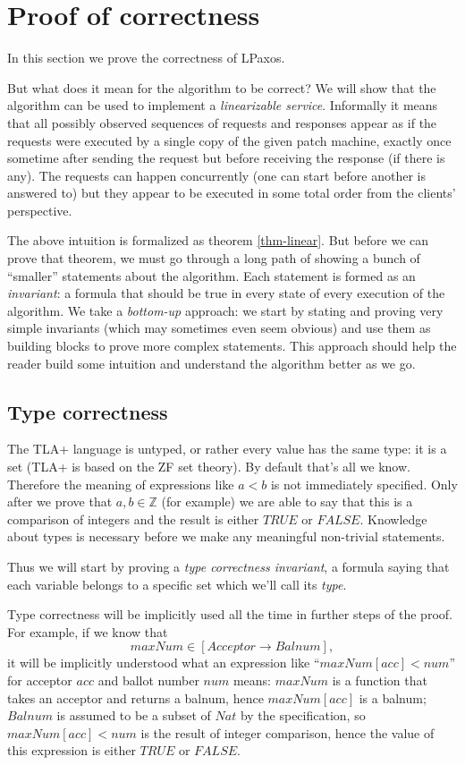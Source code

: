 \documentclass[12pt,a4paper,en]{pracamgr}
\newcommand{\ti}[1]{\textit{#1}}
\newcommand{\mbb}[1]{\mathbb{#1}}
\begin{document}
\section{Proof of correctness}\label{sect-proof}

In this section we prove the correctness of LPaxos.

But what does it mean for the algorithm to be correct? We will show that the algorithm can be used to implement a \ti{linearizable service}. Informally it means that all possibly observed sequences of requests and responses appear as if the requests were executed by a single copy of the given patch machine, exactly once sometime after sending the request but before receiving the response (if there is any). The requests can happen concurrently (one can start before another is answered to) but they appear to be executed in some total order from the clients' perspective.

The above intuition is formalized as theorem \ref{thm-linear}. But before we can prove that theorem, we must go through a long path of showing a bunch of ``smaller'' statements about the algorithm. Each statement is formed as an \ti{invariant}: a formula that should be true in every state of every execution of the algorithm. We take a \ti{bottom-up} approach: we start by stating and proving very simple invariants (which may sometimes even seem obvious) and use them as building blocks to prove more complex statements. This approach should help the reader build some intuition and understand the algorithm better as we go.

\subsection{Type correctness}\label{typeok}

The TLA+ language is untyped, or rather every value has the same type: it is a set (TLA+ is based on the ZF set theory). By default that's all we know. Therefore the meaning of expressions like $a < b$ is not immediately specified. Only after we prove that $a, b \in \mbb Z$ (for example) we are able to say that this is a comparison of integers and the result is either $TRUE$ or $FALSE$. Knowledge about types is necessary before we make any meaningful non-trivial statements.

Thus we will start by proving a \ti{type correctness invariant}, a formula saying that each variable belongs to a specific set which we'll call its \ti{type}.

Type correctness will be implicitly used all the time in further steps of the proof. For example, if we know that
$$ maxNum \in [Acceptor \rightarrow Balnum], $$
it will be implicitly understood what an expression like ``$maxNum[acc] < num$'' for acceptor $acc$ and ballot number $num$ means: $maxNum$ is a function that takes an acceptor and returns a balnum, hence $maxNum[acc]$ is a balnum; $Balnum$ is assumed to be a subset of $Nat$ by the specification, so $maxNum[acc] < num$ is the result of integer comparison, hence the value of this expression is either $TRUE$ or $FALSE$.
\end{document}

